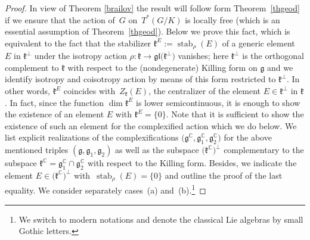 \documentclass[10pt,a4paper]{amsart}
\numberwithin{equation}{section}
\begin{document}
\begin{proof} In view of Theorem \ref{brailov} the result will follow form Theorem~\ref{thgeod} if we ensure that the action of~$G$ on~$T^*(G/K)$ is locally free (which is an essential assumption of Theorem~\ref{thgeod}). Below we prove this fact, which is equivalent to the fact that the stabilizer $\mathfrak{k}^E:=\operatorname{stab}_\rho(E)$ of a generic element~$E$ in $\mathfrak{k}^{\perp}$ under the isotropy action $\rho\colon \mathfrak{k} \rightarrow \mathfrak{gl}\big(\mathfrak{k}^{\perp}\big)$ vanishes; here $\mathfrak{k}^{\perp}$ is the orthogonal complement to $\mathfrak{k}$ with respect to the (nondegenerate) Killing form on $\mathfrak{g}$ and we identify isotropy and coisotropy action by means of this form restricted to $\mathfrak{k}^\perp$. In other words, $\mathfrak{k}^E$ coincides with~$Z_\mathfrak{k}(E)$, the centralizer of the element $E\in\mathfrak{k}^{\perp}$ in $\mathfrak{k}$. In fact, since the function $\dim\mathfrak{k}^E$ is lower semicontinuous, it is enough to show the existence of an element $E$ with $\mathfrak{k}^E=\{0\}$. Note that it is sufficient to show the existence of such an element for the complexified action which we do below. We list explicit realizations of the complexifications $\big(\mathfrak{g}^\mathbb{C},\mathfrak{g}^\mathbb{C}_1,\mathfrak{g}^\mathbb{C}_2\big)$ for the above mentioned triples $(\mathfrak{g},\mathfrak{g}_1,\mathfrak{g}_2)$ as well as the subspace $\big(\mathfrak{k}^\mathbb{C}\big)^\perp$ complementary to the subspace $\mathfrak{k}^\mathbb{C}=\mathfrak{g}_1^\mathbb{C}\cap\mathfrak{g}_2^\mathbb{C}$ with respect to the Killing form. Besides, we indicate the element $E\in\big(\mathfrak{k}^\mathbb{C}\big)^{\perp}$ with~$\operatorname{stab}_\rho(E)=\{0\}$ and outline the proof of the last equality.
We consider separately cases~(a) and~(b).\footnote{We switch to modern notations and denote the classical Lie algebras by small Gothic letters.}


\end{proof}
\end{document}
